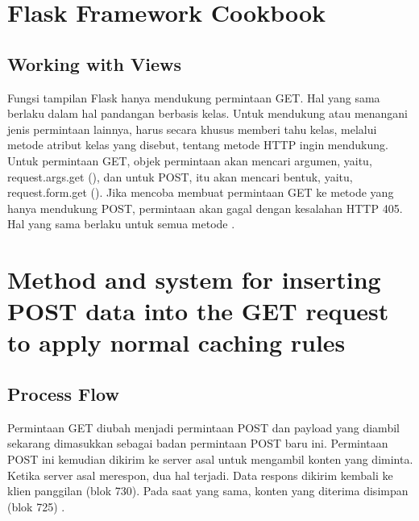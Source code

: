 \section{Flask Framework Cookbook}
\subsection{Working with Views}
Fungsi tampilan Flask hanya mendukung permintaan GET. Hal yang sama berlaku dalam hal pandangan berbasis kelas. Untuk mendukung atau menangani jenis permintaan lainnya, harus secara khusus memberi tahu kelas, melalui metode atribut kelas yang disebut, tentang metode HTTP ingin mendukung. Untuk permintaan GET, objek permintaan akan mencari argumen, yaitu, request.args.get (), dan untuk POST, itu akan mencari bentuk, yaitu, request.form.get (). Jika mencoba membuat permintaan GET ke metode yang hanya mendukung POST, permintaan akan gagal dengan kesalahan HTTP 405. Hal yang sama berlaku untuk semua metode \cite{aggarwal2014flask}. 

\section{Method and system for inserting POST data into the GET request to apply normal caching rules}
\subsection{Process Flow}
Permintaan GET diubah menjadi permintaan POST dan payload yang diambil sekarang dimasukkan sebagai badan permintaan POST baru ini. Permintaan POST ini kemudian dikirim ke server asal untuk mengambil konten yang diminta. Ketika server asal merespon, dua hal terjadi. Data respons dikirim kembali ke klien panggilan (blok 730). Pada saat yang sama, konten yang diterima disimpan (blok 725) \cite{sloat2009method}. 